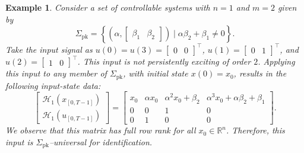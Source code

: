\documentclass[journal,twoside,web]{ieeecolor}
\newcommand{\set}[2]{\left\{#1 \mid #2\right\}}
\newtheorem{example}[theorem]{Example}
\begin{document}
\begin{example}
\label{ex:PE_not_univ}
Consider a set of controllable systems with \mbox{$n=1$} and $m=2$ given by 
\begin{equation}
\Sigma_\text{pk}=\set{(\alpha,\begin{bmatrix}
\beta_1 & \beta_2
\end{bmatrix})}{\alpha\beta_2+ \beta_1\neq 0}.
\end{equation}
Take the input signal as \mbox{$u(0)=u(3)=\begin{bmatrix}
0 & 0
\end{bmatrix}^\top$}, \mbox{$u(1)=\begin{bmatrix}
0 & 1
\end{bmatrix}^\top$}, and \mbox{$u(2)=\begin{bmatrix}
1 & 0
\end{bmatrix}^\top$}. This input is not persistently exciting of order $2$. Applying this input to any member of $\Sigma_\text{pk}$, with initial state $x(0)=x_0$, results in the following input-state data:
\begin{equation}
\begin{bmatrix}
\mathcal{H}_1(x_{[0,T-1]}) \\
\mathcal{H}_1(u_{[0,T-1]})
\end{bmatrix}\!\!=\!\!\begin{bmatrix}
x_0 \!&\! \alpha x_0  \!&\! \alpha^2 x_0\!+\!\beta_2  \!&\! \alpha^3 x_0\!+\!\alpha\beta_2\!+\!\beta_1 \\
0  \!&\! 0  \!&\! 1  \!&\! 0 \\
0  \!&\! 1  \!&\! 0  \!&\! 0
\end{bmatrix}\!.
\end{equation}
We observe that this matrix has full row rank for all $x_0\in\mathbb{R}^n$. Therefore, this input is $\Sigma_\text{pk}$--universal for identification. 
\end{example}
\end{document}
